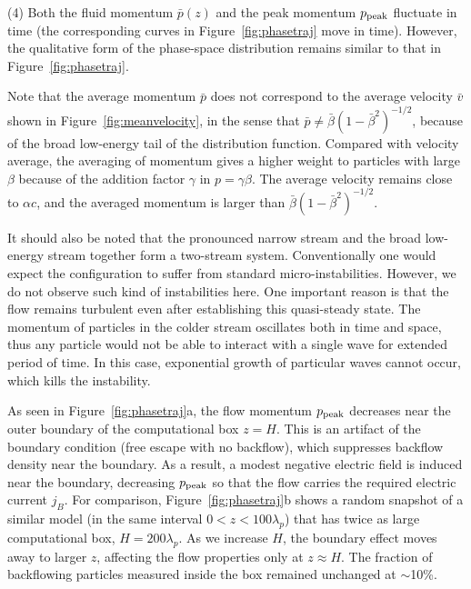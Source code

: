 (4) Both the fluid momentum $\bar{p}(z)$ and the peak momentum $p_{\rm peak}$
fluctuate in time (the corresponding curves in Figure~\ref{fig:phasetraj} move in time).
However, the qualitative form of the
phase-space distribution remains similar to that in Figure~\ref{fig:phasetraj}.

Note that the average momentum $\bar{p}$ does not correspond to
the average velocity $\bar{v}$ shown in Figure~\ref{fig:meanvelocity}, in the sense that
$\bar{p} \neq \bar{\beta}(1-\bar{\beta}^2)^{-1/2}$, because of the broad low-energy tail of
the distribution function. Compared with velocity average,
 the averaging of momentum gives a higher weight to particles with
 large $\beta$ because of the addition factor $\gamma$ in $p=\gamma\beta$.
The average velocity remains close to $\alpha c$, and the averaged momentum is
larger than $\bar{\beta}(1-\bar{\beta}^2)^{-1/2}$.

It should also be noted that the pronounced narrow stream and the broad low-energy stream together
form a two-stream system. Conventionally one would expect the configuration to suffer
from standard micro-instabilities. However, we do not observe such kind of instabilities here.
One important reason is that the
flow remains turbulent even after establishing this quasi-steady state. The momentum
of particles in the colder stream oscillates both in time and space, thus any particle
would not be able to interact with a single wave for extended period of time. In this
case, exponential growth of particular waves cannot occur, which kills the instability.

As seen in Figure~\ref{fig:phasetraj}a, the flow momentum $p_{\rm peak}$ decreases
near the outer boundary of the computational box $z=H$.
This is an artifact of the boundary condition (free escape with no backflow), which
suppresses backflow density near the boundary. As a result, a modest negative electric
field is induced near the boundary, decreasing $p_{\rm peak}$ so that the flow carries
the required electric current $j_B$.
For comparison, Figure~\ref{fig:phasetraj}b shows a random snapshot of a similar model (in the same interval $0<z<100\lambda_p$) that has twice as large computational box, $H=200\lambda_p$.
As we increase $H$, the boundary effect moves away to larger $z$, affecting the flow
properties only at $z\approx H$. The fraction of backflowing particles measured inside the
box remained unchanged at $\sim$10\%.

